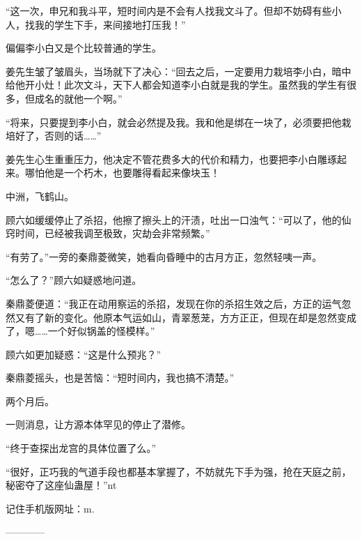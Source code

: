 \begin{this_body}
“这一次，申兄和我斗平，短时间内是不会有人找我文斗了。但却不妨碍有些小人，找我的学生下手，来间接地打压我！”

偏偏李小白又是个比较普通的学生。

姜先生皱了皱眉头，当场就下了决心：“回去之后，一定要用力栽培李小白，暗中给他开小灶！此次文斗，天下人都会知道李小白就是我的学生。虽然我的学生有很多，但成名的就他一个啊。”

“将来，只要提到李小白，就会必然提及我。我和他是绑在一块了，必须要把他栽培好了，否则的话……”

姜先生心生重重压力，他决定不管花费多大的代价和精力，也要把李小白雕琢起来。哪怕他是一个朽木，也要雕得看起来像块玉！

中洲，飞鹤山。

顾六如缓缓停止了杀招，他擦了擦头上的汗渍，吐出一口浊气：“可以了，他的仙窍时间，已经被我调至极致，灾劫会非常频繁。”

“有劳了。”一旁的秦鼎菱微笑，她看向昏睡中的古月方正，忽然轻咦一声。

“怎么了？”顾六如疑惑地问道。

秦鼎菱便道：“我正在动用察运的杀招，发现在你的杀招生效之后，方正的运气忽然又有了新的变化。他原本气运如山，青翠葱茏，方方正正，但现在却是忽然变成了，嗯……一个好似锅盖的怪模样。”

顾六如更加疑惑：“这是什么预兆？”

秦鼎菱摇头，也是苦恼：“短时间内，我也搞不清楚。”

两个月后。

一则消息，让方源本体罕见的停止了潜修。

“终于查探出龙宫的具体位置了么。”

“很好，正巧我的气道手段也都基本掌握了，不妨就先下手为强，抢在天庭之前，秘密夺了这座仙蛊屋！”nt

记住手机版网址：m.

------------

\end{this_body}

